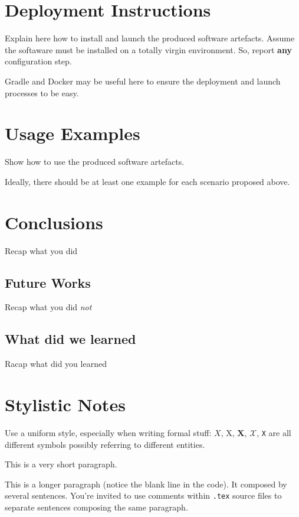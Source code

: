 \documentclass{scrartcl}
\begin{document}
\section{Deployment Instructions}

Explain here how to install and launch the produced software artefacts.
%
Assume the softaware must be installed on a totally virgin environment.
%
So, report \textbf{any} configuration step.

Gradle and Docker may be useful here to ensure the deployment and launch processes to be easy.

\section{Usage Examples}

Show how to use the produced software artefacts.

Ideally, there should be at least one example for each scenario proposed above.

\section{Conclusions}

Recap what you did

\subsection{Future Works}

Recap what you did \emph{not}

\subsection{What did we learned}

Racap what did you learned


\section*{Stylistic Notes}

Use a uniform style, especially when writing formal stuff: $X$, X, $\mathbf{X}$, $\mathcal{X}$, \texttt{X} are all different symbols possibly referring to different entities. 

This is a very short paragraph.

This is a longer paragraph (notice the blank line in the code).
It composed by several sentences.
%
You're invited to use comments within \texttt{.tex} source files to separate sentences composing the same paragraph.
\end{document}
